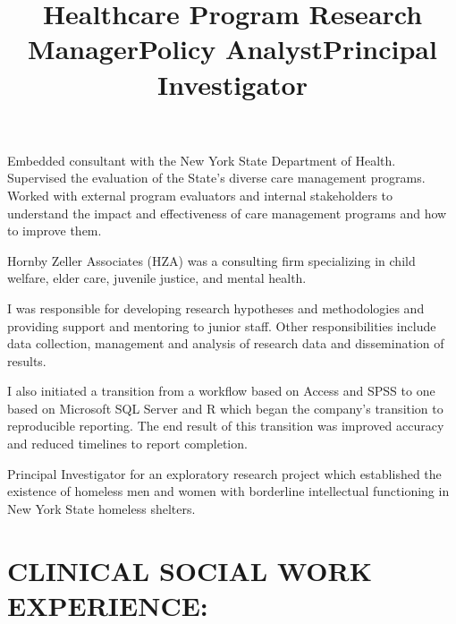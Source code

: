 \documentclass[line, mm, 10pt]{res}
\begin{document}
\begin{resume}
  \title{Healthcare Program Research Manager}
  \begin{position}
    Embedded consultant with the New York State Department of Health. Supervised
    the evaluation of the State's diverse care management programs. Worked with
    external program evaluators and internal stakeholders to understand the
    impact and effectiveness of care management programs and how to improve
    them.
  \end{position}
  
  \title{Policy Analyst}
  \begin{position}
    Hornby Zeller Associates (HZA) was a consulting firm specializing in child
    welfare, elder care, juvenile justice, and mental health. 
    
    I was responsible for developing research hypotheses and methodologies and
    providing support and mentoring to junior staff. Other responsibilities
    include data collection, management and analysis of research data and
    dissemination of results. 
    
    I also initiated a transition from a workflow based on Access and SPSS to
    one based on Microsoft SQL Server and R which began the company's transition
    to reproducible reporting. The end result of this transition was improved
    accuracy and reduced timelines to report completion.
  \end{position}

  \title{Principal Investigator}
  \begin{position}
    Principal Investigator for an exploratory research project which established
    the existence of homeless men and women with borderline intellectual
    functioning in New York State homeless shelters.
  \end{position}



  \newpage
  \section{CLINICAL SOCIAL WORK EXPERIENCE:}


\end{resume}
\end{document}
